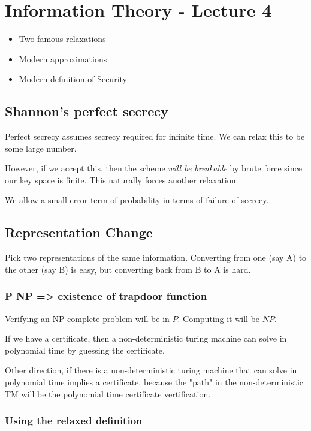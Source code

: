 \section{Information Theory - Lecture 4}

\begin{itemize}
    \item Two famous relaxations
    \item Modern approximations
    \item Modern definition of Security
\end{itemize}

\subsection{Shannon's perfect secrecy}
Perfect secrecy assumes secrecy required for infinite time. We can relax 
this to be some large number.

However, if we accept this, then the scheme \textit{will be breakable} by brute force
since our key space is finite. This naturally forces another relaxation:

We allow a small error term of probability in terms of failure of secrecy.



\subsection{Representation Change}

Pick two representations of the same information. Converting from one (say A)
to the other (say B) is easy, but converting back from B to A is hard.

\subsubsection{P \neq NP => existence of trapdoor function}

Verifying an NP complete problem will be in $P$. Computing it will be $NP$.


If we have a certificate, then a non-deterministic turing machine can solve in
polynomial time by guessing the certificate.

Other direction, if there is a non-deterministic turing machine that can solve
in polynomial time implies a certificate, because the "path" in the
non-deterministic TM will be the polynomial time certificate vertification.

\subsubsection{Using the relaxed definition}

